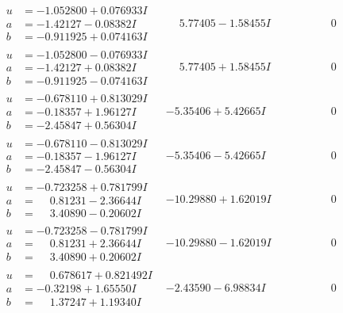 \documentclass[1p]{elsarticle_modified}
\theoremstyle{definition}
\begin{document}
$$\begin{array}{c|c|c}
\begin{aligned}
u &= -1.052800 + 0.076933 I \\
a &= -1.42127 - 0.08382 I \\
b &= -0.911925 + 0.074163 I\end{aligned}
 & \phantom{-}5.77405 - 1.58455 I & \phantom{-0.000000 } 0 \\ \hline\begin{aligned}
u &= -1.052800 - 0.076933 I \\
a &= -1.42127 + 0.08382 I \\
b &= -0.911925 - 0.074163 I\end{aligned}
 & \phantom{-}5.77405 + 1.58455 I & \phantom{-0.000000 } 0 \\ \hline\begin{aligned}
u &= -0.678110 + 0.813029 I \\
a &= -0.18357 + 1.96127 I \\
b &= -2.45847 + 0.56304 I\end{aligned}
 & -5.35406 + 5.42665 I & \phantom{-0.000000 } 0 \\ \hline\begin{aligned}
u &= -0.678110 - 0.813029 I \\
a &= -0.18357 - 1.96127 I \\
b &= -2.45847 - 0.56304 I\end{aligned}
 & -5.35406 - 5.42665 I & \phantom{-0.000000 } 0 \\ \hline\begin{aligned}
u &= -0.723258 + 0.781799 I \\
a &= \phantom{-}0.81231 - 2.36644 I \\
b &= \phantom{-}3.40890 - 0.20602 I\end{aligned}
 & -10.29880 + 1.62019 I & \phantom{-0.000000 } 0 \\ \hline\begin{aligned}
u &= -0.723258 - 0.781799 I \\
a &= \phantom{-}0.81231 + 2.36644 I \\
b &= \phantom{-}3.40890 + 0.20602 I\end{aligned}
 & -10.29880 - 1.62019 I & \phantom{-0.000000 } 0 \\ \hline\begin{aligned}
u &= \phantom{-}0.678617 + 0.821492 I \\
a &= -0.32198 + 1.65550 I \\
b &= \phantom{-}1.37247 + 1.19340 I\end{aligned}
 & -2.43590 - 6.98834 I & \phantom{-0.000000 } 0 \\ \hline\begin{aligned}

\end{aligned}
\end{array}$$
\end{document}
